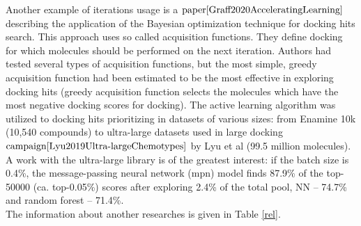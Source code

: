 Another example of iterations usage is a $\text{paper}{\cite{Graff2020AcceleratingLearning}}$ 
describing the application of the Bayesian optimization technique for docking hits 
search.
This approach uses so called acquisition functions.
They define docking for which molecules should be performed on the next iteration.
Authors had tested several types of acquisition functions, but the most simple, 
greedy acquisition function had been estimated to be the most effective in exploring 
docking hits
(greedy acquisition function selects the molecules which have the most negative 
docking scores for docking).
The active learning algorithm was utilized to docking hits prioritizing in datasets 
of various sizes: from Enamine 10k (10,540 compounds) to ultra-large datasets used 
in large docking $\text{campaign}{\cite{Lyu2019Ultra-largeChemotypes}}$ by Lyu 
et al (99.5 million molecules).
A work with the ultra-large library is of the greatest interest: if the batch size 
is 0.4\%, the message-passing neural network (\acrshort{mpn}) model finds 87.9\% 
of the top-50000 (ca. top-0.05\%) scores after exploring 2.4\% of the total pool, 
NN -- 74.7\% and random forest -- 71.4\%.\\

The information about another researches is given in Table \ref{rel}.


